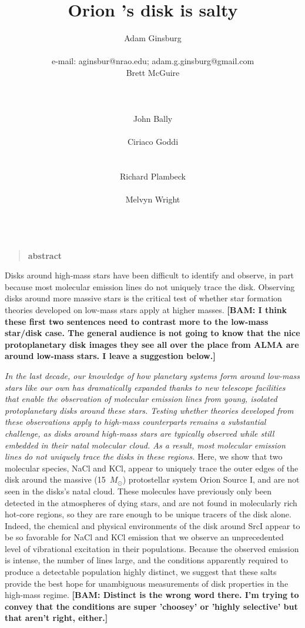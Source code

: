 \documentclass[12pt]{article}
\date{}
\author{
Adam Ginsburg\\
\nraojansky\\
e-mail: aginsbur@nrao.edu; adam.g.ginsburg@gmail.com\\
Brett McGuire\\
\hubble\\
\nraocv\\
\cfa\\
John Bally\\
\casa\\
Ciriaco Goddi\\
\allegro\\
\radboud\\
Richard Plambeck\\
\berkeley\\
Melvyn Wright\\
\berkeley\\
}
\title{Orion \sourcei's disk is salty}
\newenvironment{sciabstract}{%
\begin{quote} \bf  }
{\end{quote}}
\newcommand{\bam}[1]{\textcolor{green!65!black}{\textbf{[BAM: #1]}}}
\newcommand{\sourcei}{SrcI\xspace}
\newcommand{\msun}{\ensuremath{M_{\odot}}\xspace}			%
\begin{document}


\maketitle

\begin{sciabstract}
    abstract
\end{sciabstract}




Disks around high-mass stars have been difficult to identify and observe, in
part because most molecular emission lines do not uniquely trace the disk.
Observing disks around more massive stars is the critical test of whether star
formation theories developed on low-mass stars apply at higher masses.  \bam{I think these first two sentences need to contrast more to the low-mass star/disk case.  The general audience is not going to know that the nice protoplanetary disk images they see all over the place from ALMA are around low-mass stars.  I leave a suggestion below.}

\emph{In the last decade, our knowledge of how planetary systems form around low-mass stars like our own has dramatically expanded thanks to new telescope facilities that enable the observation of molecular emission lines from young, isolated protoplanetary disks around these stars.  Testing whether theories developed from these observations apply to high-mass counterparts remains a substantial challenge, as disks around high-mass stars are typically observed while still embedded in their natal molecular cloud.  As a result, most molecular emission lines do not uniquely trace the disks in these regions.} Here,
we show that two molecular species, NaCl and KCl, appear to uniquely trace the
outer edges of the disk around the massive (15~\msun) protostellar system Orion
Source I, and are not seen in the disks's natal cloud. These molecules have previously only been detected in the atmospheres
of dying stars, and are not found in molecularly rich hot-core regions, so they
are rare enough to be unique tracers of the disk alone.  Indeed, the chemical
and physical environments of the disk around \sourcei appear to be so
favorable for NaCl and KCl emission that we observe an unprecedented level of vibrational excitation in their populations.  Because the observed emission is intense, the number of lines large, and the conditions apparently required to produce a detectable population highly distinct, we suggest that
these salts provide the best hope for unambiguous measurements of disk
properties in the high-mass regime.  \bam{Distinct is the wrong word there.  I'm trying to convey that the conditions are super 'choosey' or 'highly selective' but that aren't right, either.}
\end{document}
